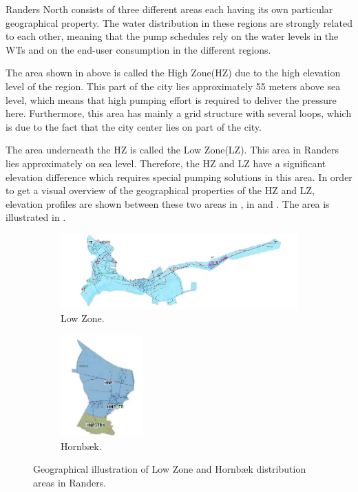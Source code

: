 Randers North consists of three different areas each having its own particular geographical property. The water distribution in these regions are strongly related to each other, meaning that the pump schedules rely on the water levels in the WTs and on the end-user consumption in the different regions. 

The area shown in  above is called the High Zone(HZ) due to the high elevation level of the region. This part of the city lies approximately 55 meters above sea level, which means that high pumping effort is required to deliver the pressure here. Furthermore, this area has mainly a grid structure with several loops, which is due to the fact that the city center lies on part of the city.  

The area underneath the HZ is called the Low Zone(LZ). This area in Randers lies approximately on sea level. Therefore, the HZ and LZ have a significant elevation difference which requires special pumping solutions in this area. In order to get a visual overview of the geographical properties of the HZ and LZ, elevation profiles are shown between these two areas in , in  and . The area is illustrated in .

\begin{figure}[H]
\centering
\begin{subfigure}{.49\textwidth}
\centering
\hspace{3mm}
\includegraphics[width=1.1\textwidth]{report/pictures/Lowzone_region}
\vspace{2mm}
  \caption{Low Zone.}
  \label{fig:lowzone_region}
\end{subfigure}
\begin{subfigure}{.49\textwidth}
\centering
\hspace{3mm}
\includegraphics[width=0.35\textwidth]{report/pictures/Hornbaek_region}
  \caption{Hornbæk.}
  \label{fig:hornbaek_region}
\end{subfigure}
\caption{Geographical illustration of Low Zone and Hornbæk distribution areas in Randers.}
\label{fig:lz_hbp_pic}
\end{figure}
\vspace{-3mm}

